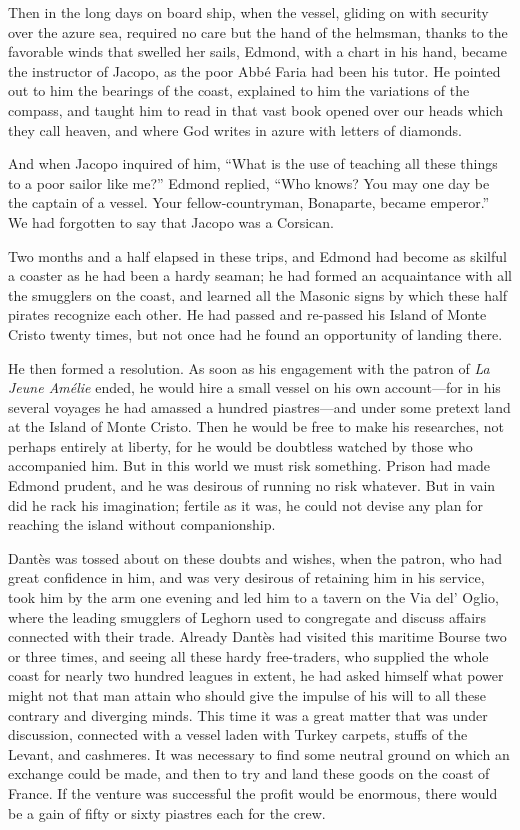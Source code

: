 Then in the long days on board ship, when the vessel, gliding on with
security over the azure sea, required no care but the hand of the
helmsman, thanks to the favorable winds that swelled her sails, Edmond,
with a chart in his hand, became the instructor of Jacopo, as the poor
Abbé Faria had been his tutor. He pointed out to him the bearings of
the coast, explained to him the variations of the compass, and taught
him to read in that vast book opened over our heads which they call
heaven, and where God writes in azure with letters of diamonds.

And when Jacopo inquired of him, “What is the use of teaching all these
things to a poor sailor like me?” Edmond replied, “Who knows? You may
one day be the captain of a vessel. Your fellow-countryman, Bonaparte,
became emperor.” We had forgotten to say that Jacopo was a Corsican.

Two months and a half elapsed in these trips, and Edmond had become as
skilful a coaster as he had been a hardy seaman; he had formed an
acquaintance with all the smugglers on the coast, and learned all the
Masonic signs by which these half pirates recognize each other. He had
passed and re-passed his Island of Monte Cristo twenty times, but not
once had he found an opportunity of landing there.

He then formed a resolution. As soon as his engagement with the patron
of \textit{La Jeune Amélie} ended, he would hire a small vessel on his own
account—for in his several voyages he had amassed a hundred
piastres—and under some pretext land at the Island of Monte Cristo.
Then he would be free to make his researches, not perhaps entirely at
liberty, for he would be doubtless watched by those who accompanied
him. But in this world we must risk something. Prison had made Edmond
prudent, and he was desirous of running no risk whatever. But in vain
did he rack his imagination; fertile as it was, he could not devise any
plan for reaching the island without companionship.

Dantès was tossed about on these doubts and wishes, when the patron,
who had great confidence in him, and was very desirous of retaining him
in his service, took him by the arm one evening and led him to a tavern
on the Via del’ Oglio, where the leading smugglers of Leghorn used to
congregate and discuss affairs connected with their trade. Already
Dantès had visited this maritime Bourse two or three times, and seeing
all these hardy free-traders, who supplied the whole coast for nearly
two hundred leagues in extent, he had asked himself what power might
not that man attain who should give the impulse of his will to all
these contrary and diverging minds. This time it was a great matter
that was under discussion, connected with a vessel laden with Turkey
carpets, stuffs of the Levant, and cashmeres. It was necessary to find
some neutral ground on which an exchange could be made, and then to try
and land these goods on the coast of France. If the venture was
successful the profit would be enormous, there would be a gain of fifty
or sixty piastres each for the crew.

